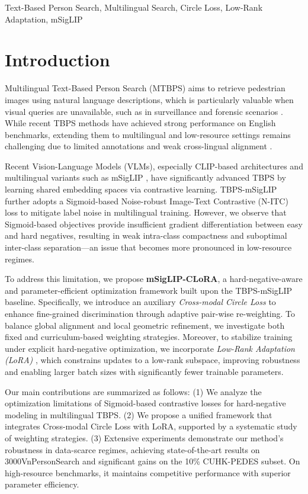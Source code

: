 \documentclass[conference]{IEEEtran}
\begin{document}
\begin{IEEEkeywords}
Text-Based Person Search, Multilingual Search, Circle Loss, Low-Rank Adaptation, mSigLIP
\end{IEEEkeywords}

\section{Introduction}\label{intro}

Multilingual Text-Based Person Search (MTBPS) aims to retrieve pedestrian images using natural language descriptions, which is particularly valuable when visual queries are unavailable, such as in surveillance and forensic scenarios \cite{Li_2017_CVPR}. While recent TBPS methods have achieved strong performance on English benchmarks, extending them to multilingual and low-resource settings remains challenging due to limited annotations and weak cross-lingual alignment \cite{pmlr-v139-jia21b,9648695}.

Recent Vision-Language Models (VLMs), especially CLIP-based architectures and multilingual variants such as mSigLIP \cite{Zhai_2023_ICCV}, have significantly advanced TBPS by learning shared embedding spaces via contrastive learning. TBPS-mSigLIP \cite{tran2025multilingual} further adopts a Sigmoid-based Noise-robust Image-Text Contrastive (N-ITC) loss to mitigate label noise in multilingual training. However, we observe that Sigmoid-based objectives provide insufficient gradient differentiation between easy and hard negatives, resulting in weak intra-class compactness and suboptimal inter-class separation—an issue that becomes more pronounced in low-resource regimes.

To address this limitation, we propose \textbf{mSigLIP-CLoRA}, a hard-negative-aware and parameter-efficient optimization framework built upon the TBPS-mSigLIP baseline. Specifically, we introduce an auxiliary \textit{Cross-modal Circle Loss} \cite{sun2020circle} to enhance fine-grained discrimination through adaptive pair-wise re-weighting. To balance global alignment and local geometric refinement, we investigate both fixed and curriculum-based weighting strategies. Moreover, to stabilize training under explicit hard-negative optimization, we incorporate \textit{Low-Rank Adaptation (LoRA)} \cite{hu2022lora}, which constrains updates to a low-rank subspace, improving robustness and enabling larger batch sizes with significantly fewer trainable parameters.

Our main contributions are summarized as follows:
(1) We analyze the optimization limitations of Sigmoid-based contrastive losses for hard-negative modeling in multilingual TBPS.
(2) We propose a unified framework that integrates Cross-modal Circle Loss with LoRA, supported by a systematic study of weighting strategies.
(3) Extensive experiments demonstrate our method's robustness in data-scarce regimes, achieving state-of-the-art results on 3000VnPersonSearch and significant gains on the 10\% CUHK-PEDES subset. On high-resource benchmarks, it maintains competitive performance with superior parameter efficiency.
\end{document}
